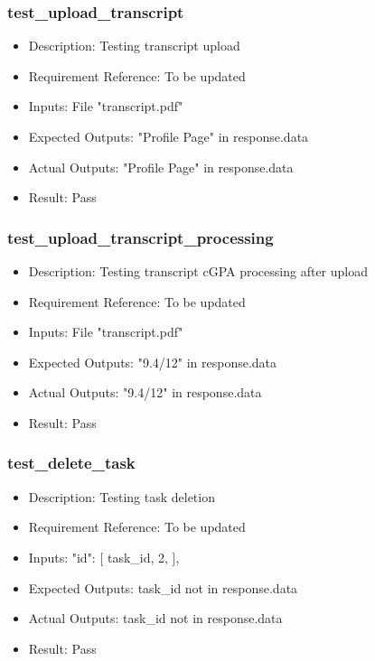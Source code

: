 \documentclass[12pt, titlepage]{article}
\begin{document}
\subsubsection{test\_upload\_transcript}\label{3.1.14}
\begin{itemize}
    \item Description: Testing transcript upload
    \item Requirement Reference: To be updated
    \item Inputs: File "transcript.pdf"
    \item Expected Outputs: "Profile Page" in response.data
    \item Actual Outputs: "Profile Page" in response.data
    \item Result: Pass
\end{itemize}
\subsubsection{test\_upload\_transcript\_processing}\label{3.1.15}
\begin{itemize}
    \item Description: Testing transcript cGPA processing after upload
    \item Requirement Reference: To be updated
    \item Inputs: File "transcript.pdf"
    \item Expected Outputs: "9.4/12" in response.data
    \item Actual Outputs: "9.4/12" in response.data
    \item Result: Pass
\end{itemize}
\subsubsection{test\_delete\_task}\label{3.1.16}
\begin{itemize}
    \item Description: Testing task deletion 
    \item Requirement Reference: To be updated
    \item Inputs:  "id": [
                task\_id,
                2,
            ], 
    \item Expected Outputs: task\_id not in response.data
    \item Actual Outputs: task\_id not in response.data
    \item Result: Pass
\end{itemize}
\end{document}
